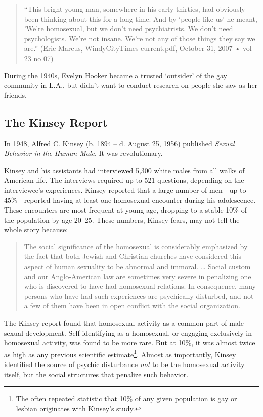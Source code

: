 \begin{refsection}
\begin{quote}

``This bright young man, somewhere in his early thirties, had obviously been thinking about this for a long time. And by `people like us' he meant, 'We're homosexual, but we don't need psychiatrists. We don't need psychologists. We're not insane. We're not any of those things they say we are.'' (Eric Marcus, WindyCityTimes-current.pdf, October 31, 2007 • vol 23 no 07)
\end{quote}

During the 1940s, Evelyn Hooker became a trusted `outsider' of the gay community in L.A., but didn't want to conduct research on people she saw as her friends.

\subsection{The Kinsey Report}
\label{thekinseyreport}

In 1948, Alfred C. Kinsey (b. 1894 – d. August 25, 1956) published \emph{Sexual Behavior in the Human Male}. It was revolutionary.

Kinsey and his assistants had interviewed 5,300 white males from all walks of American life. The interviews required up to 521 questions, depending on the interviewee's experiences. Kinsey reported that a large number of men---up to 45\%---reported having at least one homosexual encounter during his adolescence. These encounters are most frequent at young age, dropping to a stable 10\% of the population by age 20--25. These numbers, Kinsey fears, may not tell the whole story because:

\begin{quote}

The social significance of the homosexual is considerably emphasized by the fact that both Jewish and Christian churches have considered this aspect of human sexuality to be abnormal and immoral. {\ldots} Social custom and our Anglo-American law are sometimes very severe in penalizing one who is discovered to have had homosexual relations. In consequence, many persons who have had such experiences are psychically disturbed, and not a few of them have been in open conflict with the social organization. ~\citep[p. 610]{Kinsey:1998ur}
\end{quote}

The Kinsey report found that homosexual activity as a common part of male sexual development. Self-identifying as a homosexual, or engaging exclusively in homosexual activity, was found to be more rare. But at 10\%, it was almost twice as high as any previous scientific estimate\footnote{The often repeated statistic that 10\% of any given population is gay or lesbian originates with Kinsey's study.}. Almost as importantly, Kinsey identified the source of psychic disturbance \emph{not} to be the homosexual activity itself, but the social structures that penalize such behavior.


\end{refsection}
